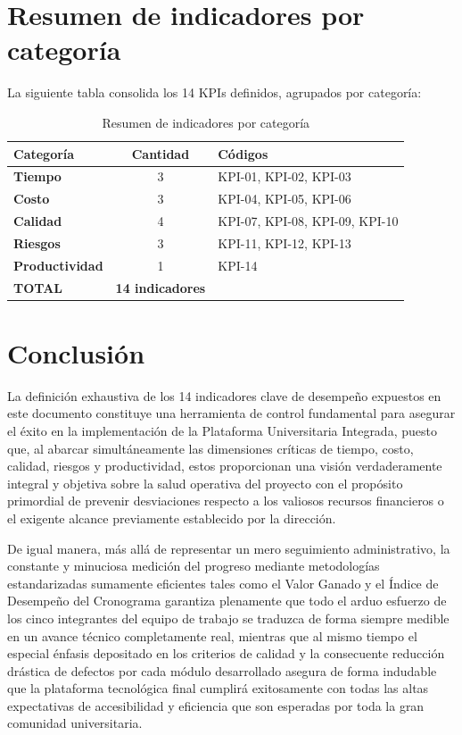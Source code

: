 \documentclass[11pt,spanish]{article}
\begin{document}
\section{Resumen de indicadores por categoría}

La siguiente tabla consolida los 14 KPIs definidos, agrupados por categoría:

\begin{table}[H]
\centering
\small
\caption{Resumen de indicadores por categoría}\label{tab:resumen-indicadores}
\begin{tabular}{l c l}
\toprule
\textbf{Categoría} & \textbf{Cantidad} & \textbf{Códigos} \\
\midrule
\textbf{Tiempo} & 3 & KPI-01, KPI-02, KPI-03 \\
\textbf{Costo} & 3 & KPI-04, KPI-05, KPI-06 \\
\textbf{Calidad} & 4 & KPI-07, KPI-08, KPI-09, KPI-10 \\
\textbf{Riesgos} & 3 & KPI-11, KPI-12, KPI-13 \\
\textbf{Productividad} & 1 & KPI-14 \\
\midrule
\textbf{TOTAL} & \textbf{14 indicadores} & \\
\bottomrule
\end{tabular}
\end{table}

\section{Conclusión}

La definición exhaustiva de los 14 indicadores clave de desempeño expuestos en este documento constituye una herramienta de control fundamental para asegurar el éxito en la implementación de la Plataforma Universitaria Integrada, puesto que, al abarcar simultáneamente las dimensiones críticas de tiempo, costo, calidad, riesgos y productividad, estos proporcionan una visión verdaderamente integral y objetiva sobre la salud operativa del proyecto con el propósito primordial de prevenir desviaciones respecto a los valiosos recursos financieros o el exigente alcance previamente establecido por la dirección. 

De igual manera, más allá de representar un mero seguimiento administrativo, la constante y minuciosa medición del progreso mediante metodologías estandarizadas sumamente eficientes tales como el Valor Ganado y el Índice de Desempeño del Cronograma garantiza plenamente que todo el arduo esfuerzo de los cinco integrantes del equipo de trabajo se traduzca de forma siempre medible en un avance técnico completamente real, mientras que al mismo tiempo el especial énfasis depositado en los criterios de calidad y la consecuente reducción drástica de defectos por cada módulo desarrollado asegura de forma indudable que la plataforma tecnológica final cumplirá exitosamente con todas las altas expectativas de accesibilidad y eficiencia que son esperadas por toda la gran comunidad universitaria. 
\end{document}
